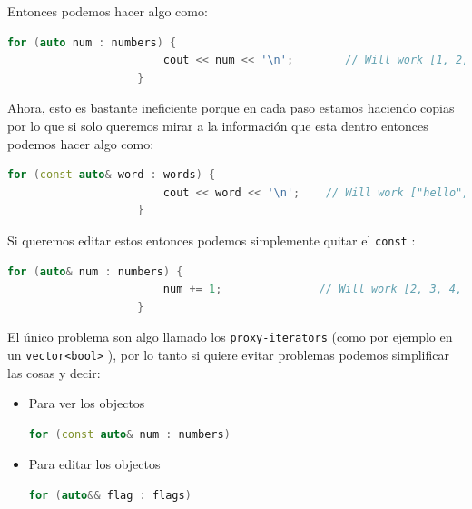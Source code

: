 \documentclass[12pt, fleqn]{report}                             %
\theoremstyle{break}                                            %
\newcommand{\textCode}[1]  { \texttt{#1} }                      %
\begin{document}
                Entonces podemos hacer algo como:
                \begin{lstlisting}[language=C++, gobble=20]
                    for (auto num : numbers) {
                        cout << num << '\n';        // Will work [1, 2, 3, 4, 5]
                    }
                \end{lstlisting}

                Ahora, esto es bastante ineficiente porque en cada paso estamos haciendo copias
                por lo que si solo queremos mirar a la información que esta dentro entonces podemos hacer
                algo como:
                \begin{lstlisting}[language=C++, gobble=20]
                    for (const auto& word : words) {
                        cout << word << '\n';    // Will work ["hello", "world", ":D"]
                    }
                \end{lstlisting}

                Si queremos editar estos entonces podemos simplemente quitar el \textCode{const}:
                \begin{lstlisting}[language=C++, gobble=20]
                    for (auto& num : numbers) {
                        num += 1;               // Will work [2, 3, 4, 5, 6]
                    }
                \end{lstlisting}

                El único problema son algo llamado los \textCode{proxy-iterators} 
                (como por ejemplo en un \textCode{vector<bool>}), por lo tanto
                si quiere evitar problemas podemos simplificar las cosas y decir:
                \begin{itemize}
                    \item Para ver los objectos
                        \begin{lstlisting}[language=C++, gobble=28]
                            for (const auto& num : numbers)
                        \end{lstlisting}
                    \item Para editar los objectos
                        \begin{lstlisting}[language=C++, gobble=28]
                            for (auto&& flag : flags)
                        \end{lstlisting}
                \end{itemize}

                \cite{forauto}
\end{document}
